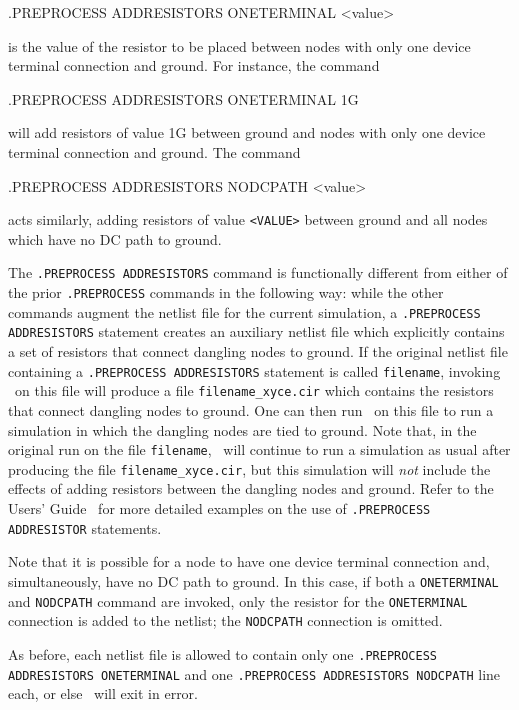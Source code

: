 \begin{Command}

\format
.PREPROCESS ADDRESISTORS ONETERMINAL <value>

\arguments

\begin{Arguments}


is the value of the resistor to be placed between
nodes with only one device terminal connection and ground.  For instance,
the command

\end{Arguments}

\examples
.PREPROCESS ADDRESISTORS ONETERMINAL 1G

\normalfont
will add resistors of value 1G between ground and nodes with only one
device terminal connection and ground.  The command

\examples

.PREPROCESS ADDRESISTORS NODCPATH <value>

\normalfont

acts similarly, adding resistors of value {\tt <VALUE>} between ground and
all nodes which have no DC path to ground.

The {\tt .PREPROCESS ADDRESISTORS} command is functionally different from
either of the prior {\tt .PREPROCESS} commands in the following way:  while
the other commands augment the netlist file for the current simulation, a
{\tt .PREPROCESS ADDRESISTORS} statement creates an auxiliary netlist file
which explicitly contains a set of resistors that connect dangling nodes to
ground.  If the original netlist file containing a {\tt .PREPROCESS
ADDRESISTORS} statement is called {\tt filename}, invoking \Xyce~on this file
will produce a file {\tt filename\_xyce.cir} which contains the resistors that
connect dangling nodes to ground.  One can then run \Xyce~on this file to
run a simulation in which the dangling nodes are tied to ground.  Note that,
in the original run on the file {\tt filename}, \Xyce~will continue to run a
simulation as usual after producing the file {\tt filename\_xyce.cir}, but this
simulation will {\em not} include the effects of adding resistors between the
dangling nodes and ground.  Refer to the \Xyce{} Users' Guide~\UsersGuide{} for more detailed
examples on the use of {\tt .PREPROCESS ADDRESISTOR} statements.

Note that it is possible for a node to have one device terminal connection
and, simultaneously, have no DC path to ground.  In this case, if both a
{\tt ONETERMINAL} and {\tt NODCPATH} command are invoked, only the resistor
for the {\tt ONETERMINAL} connection is added to the netlist; the
{\tt NODCPATH} connection is omitted.

As before, each netlist file is allowed to contain only one {\tt .PREPROCESS
ADDRESISTORS ONETERMINAL} and one {\tt .PREPROCESS ADDRESISTORS NODCPATH} line
each, or else \Xyce~will exit in error.

\end{Command}
